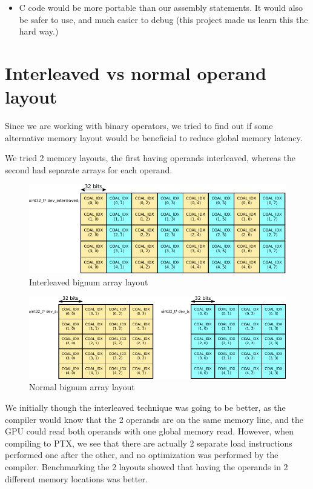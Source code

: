 \documentclass[12pt, a4paper]{report}
\begin{document}
\begin{itemize}
\item C code would be more portable than our assembly statements.
It would also be safer to use, and much easier to debug (this project made us
learn this the hard way.)
\end{itemize}

\section{Interleaved vs normal operand layout}
Since we are working with binary operators, we tried to find out if some alternative
memory layout would be beneficial to reduce global memory latency.

We tried 2 memory layouts, the first having operands interleaved, whereas the
second had separate arrays for each operand.

\begin{figure}[h]
\centering
\includegraphics[scale=1.0]{figs/interleaved_bignum_array_layout}
\caption{Interleaved bignum array layout}
\label{fig:interleaved_bignum_array_layout}
\end{figure}

\begin{figure}[h]
\centering
\includegraphics[scale=1.0]{figs/bignum_array_layout}
\caption{Normal bignum array layout}
\label{fig:bignum_array_layout}
\end{figure}

We initially though the interleaved technique was going to be better, as the
compiler would know that the 2 operands are on the same memory line, and the GPU could
read both operands with one global memory read.
However, when compiling to PTX, we
see that there are actually 2 separate load instructions performed one after the
other, and no optimization was performed by the compiler.
Benchmarking the 2 layouts showed that having the operands in 2 different memory locations was better.
\end{document}
